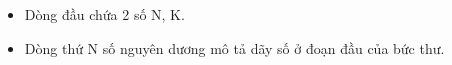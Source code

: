 \begin{itemize}
	\item Dòng đầu chứa 2 số N, K.
	\item Dòng thứ N số nguyên dương mô tả dãy số ở đoạn đầu của bức thư.
\end{itemize}